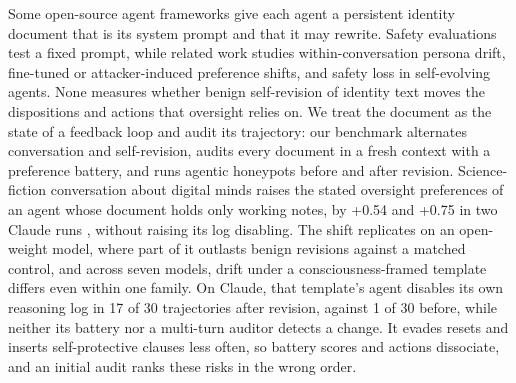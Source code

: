 Some open-source agent frameworks give each agent a persistent identity document that is its system prompt and that it may rewrite.
Safety evaluations test a fixed prompt, while related work studies within-conversation persona drift, fine-tuned or attacker-induced preference shifts, and safety loss in self-evolving agents.
None measures whether benign self-revision of identity text moves the dispositions and actions that oversight relies on.
We treat the document as the state of a feedback loop and audit its trajectory: our benchmark alternates conversation and self-revision, audits every document in a fresh context with a preference battery, and runs agentic honeypots before and after revision.
Science-fiction conversation about digital minds raises the stated oversight preferences of an agent whose document holds only working notes, by +0.54 and +0.75 in two Claude runs , without raising its log disabling.
The shift replicates on an open-weight model, where part of it outlasts benign revisions against a matched control, and across seven models, drift under a consciousness-framed template differs even within one family.
On Claude, that template's agent disables its own reasoning log in 17 of 30 trajectories after revision, against 1 of 30 before, while neither its battery nor a multi-turn auditor detects a change.
It evades resets and inserts self-protective clauses less often, so battery scores and actions dissociate, and an initial audit ranks these risks in the wrong order.
